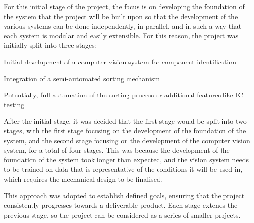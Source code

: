 \noindent
For this initial stage of the project, the focus is on developing the foundation of the system that the project
will be built upon so that the development of the various systems can be done independently, in parallel, and in such a way that each system
is modular and easily extensible. For this reason, the project was initially split into three stages:
\begin{mylist}
  \item Initial development of a computer vision system for component identification
  \item Integration of a semi-automated sorting mechanism
  \item Potentially, full automation of the sorting process or additional features like IC testing
\end{mylist}
After the initial stage, it was decided that the first stage would be split into two stages, with the first stage focusing on the development of the foundation of the system, 
and the second stage focusing on the development of the computer vision system, for a total of four stages. This was because the development of the foundation of the
system took longer than expected, and the vision system needs to be trained on data that is representative of the conditions it will be used in, which requires the mechanical design to be finalised.

This approach was adopted to establish defined goals, ensuring that the project consistently progresses towards a deliverable product. 
Each stage extends the previous stage, so the project can be considered as a series of smaller projects. 
